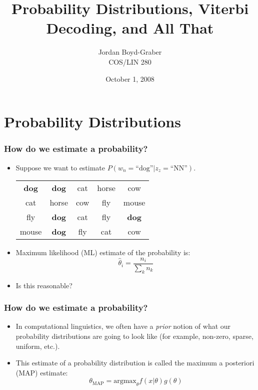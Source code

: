 \documentclass{beamer}
\title{Probability Distributions, Viterbi Decoding, and All That}
\author{Jordan Boyd-Graber \\
  COS/LIN 280}
\date{October 1, 2008}
\begin{document}
\begin{frame}
\titlepage
\end{frame}

\section{Probability Distributions}


\begin{frame}
\frametitle{How do we estimate a probability?}

\begin{itemize}
  \item Suppose we want to estimate $P(w_n = \mbox{``dog''} | z_z = \mbox{``NN''})$.  
  \pause
  \begin{center}
  \begin{tabular}{ccccc}
    \textbf{dog} & \textbf{dog} & cat & horse & cow \\
    cat & horse & cow & fly & mouse \\
    fly & \textbf{dog} & cat & fly & \textbf{dog} \\
    mouse & \textbf{dog} & fly & cat & cow 
  \end{tabular}
  \end{center}
  \pause
  \item Maximum likelihood (ML) estimate of the probability is:
  \begin{equation}
    \hat{\theta}_{i} = \frac{n_i}{\sum_{k} n_k}
  \end{equation}
  \pause
  \item Is this reasonable?
\end{itemize}
\end{frame}


\begin{frame}
\frametitle{How do we estimate a probability?}

\begin{itemize}
   \item In computational linguistics, we often have a {\em prior} notion of what our probability distributions are going to look like (for example, non-zero, sparse, uniform, etc.).
   \item This estimate of a probability distribution is called the maximum a posteriori (MAP) estimate:
     \begin{equation}
       \theta_{\mbox{MAP}} = \mbox{argmax}_{\theta} f(x|\theta)g(\theta)
     \end{equation}
\end{itemize}
\end{frame}
\end{document}
